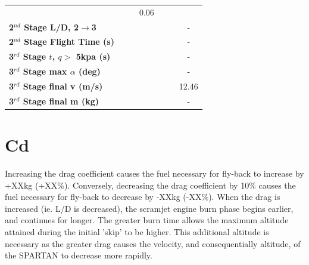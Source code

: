 \begin{table}[ht]
\begin{tabular}{l c c c c c c}
		& \secondthirdSeparationqIspOneHundredFive
		& \secondthirdSeparationqIspOneHundredTen
		&0.06
		\\
		\textbf{2$^{nd}$ Stage L/D, 2$\rightarrow$3}
		& \secondthirdSeparationLDIspNinety
		& \secondthirdSeparationLDIspNinetyFive
		& \secondthirdSeparationLDIspStandard
		& \secondthirdSeparationLDIspOneHundredFive
		& \secondthirdSeparationLDIspOneHundredTen
		& -
		\\
		\textbf{2$^{nd}$ Stage Flight Time (s)}
		& \secondFlightTimeIspNinety
		& \secondFlightTimeIspNinetyFive
		& \secondFlightTimeIspStandard
		& \secondFlightTimeIspOneHundredFive
		& \secondFlightTimeIspOneHundredTen
		& -
		\\
		\textbf{3$^{rd}$ Stage $t$, $q >$ 5kpa (s)}
		& \thirdqOverFiveIspNinety
		& \thirdqOverFiveIspNinetyFive
		& \thirdqOverFiveIspStandard
		& \thirdqOverFiveIspOneHundredFive
		& \thirdqOverFiveIspOneHundredTen
		& -
		\\
		\textbf{3$^{rd}$ Stage max $\alpha$ (deg)}
		& \thirdmaxAoAIspNinety
		& \thirdmaxAoAIspNinetyFive
		& \thirdmaxAoAIspStandard
		& \thirdmaxAoAIspOneHundredFive
		& \thirdmaxAoAIspOneHundredTen
		& -
		\\
		\textbf{3$^{rd}$ Stage final v (m/s)}
		& \thirdcircvIspNinety
		& \thirdcircvIspNinetyFive
		& \thirdcircvIspStandard
		& \thirdcircvIspOneHundredFive
		& \thirdcircvIspOneHundredTen
		&12.46
		\\
		\textbf{3$^{rd}$ Stage final m (kg)}
		& \thirdcircmIspNinety
		& \thirdcircmIspNinetyFive
		& \thirdcircmIspStandard
		& \thirdcircmIspOneHundredFive
		& \thirdcircmIspOneHundredTen
		& -
		\\
		\hline 
	\end{tabular} 
	
\end{table}

\section{Cd}

Increasing the drag coefficient causes the fuel necessary for fly-back to increase by +XXkg (+XX\%). Conversely, decreasing the drag coefficient by 10\% causes the fuel necessary for  fly-back to decrease by -XXkg (-XX\%). 
When the drag is increased (ie. L/D is decreased), the scramjet engine burn phase begins earlier, and continues for longer. 
The greater burn time allows the maximum altitude attained during the initial 'skip' to be higher. 
This additional altitude is necessary as the greater drag causes the velocity, and consequentially altitude, of the SPARTAN to decrease more rapidly.

